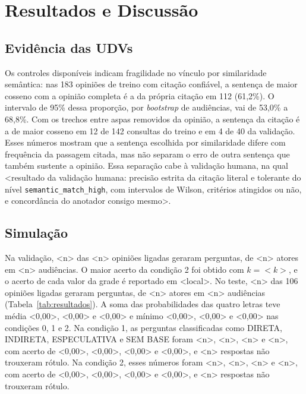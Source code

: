 \section{Resultados e Discuss\~ao}
\label{sec:resultados}

\subsection{Evidência das UDVs}
\label{sec:resultados-udv}

Os controles disponíveis indicam fragilidade no vínculo por similaridade semântica: nas 183 opiniões
de treino com citação confiável, a sentença de maior cosseno com a opinião completa é a da própria
citação em 112 (61,2\%). O intervalo de 95\% dessa proporção, por \textit{bootstrap} de audiências,
vai de 53,0\% a 68,8\%. Com os trechos entre aspas removidos da opinião, a sentença da citação é a
de maior cosseno em 12 de 142 consultas do treino e em 4 de 40 da validação. Esses números mostram
que a sentença escolhida por similaridade difere com frequência da passagem citada, mas não separam
o erro de outra sentença que também sustente a opinião. Essa separação cabe à validação humana, na
qual <resultado da validação humana: precisão estrita da citação literal e tolerante do nível
\texttt{semantic\_match\_high}, com intervalos de Wilson, critérios atingidos ou não, e concordância
do anotador consigo mesmo>.

\subsection{Simulação}
\label{sec:resultados-simulacao}



Na validação, <n> das <n> opiniões ligadas geraram perguntas, de <n> atores em <n> audiências. O
maior acerto da condição 2 foi obtido com $k = {<}k{>}$, e o acerto de cada valor da grade é
reportado em <local>. No teste, <n> das 106 opiniões ligadas
geraram perguntas, de <n> atores em <n> audiências (Tabela~\ref{tab:resultados}). A soma das
probabilidades das quatro letras teve média <0,00>, <0,00> e <0,00> e mínimo <0,00>, <0,00> e
<0,00> nas condições 0, 1 e 2. Na condição 1, as perguntas classificadas como DIRETA, INDIRETA,
ESPECULATIVA e SEM BASE foram <n>, <n>, <n> e <n>, com acerto de <0,00>, <0,00>, <0,00> e <0,00>, e
<n> respostas não trouxeram rótulo. Na condição 2, esses números foram <n>, <n>, <n> e <n>, com
acerto de <0,00>, <0,00>, <0,00> e <0,00>, e <n> respostas não trouxeram rótulo.

